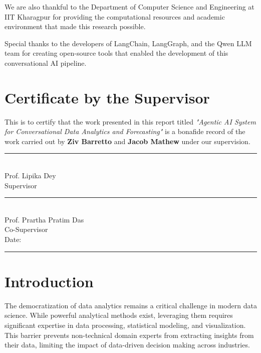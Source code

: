 \documentclass[11pt,a4paper]{article}
\begin{document}
We are also thankful to the Department of Computer Science and Engineering at IIT Kharagpur for providing the computational resources and academic environment that made this research possible.

Special thanks to the developers of LangChain, LangGraph, and the Qwen LLM team for creating open-source tools that enabled the development of this conversational AI pipeline.

\newpage
\section*{Certificate by the Supervisor}

\vspace{1cm}
This is to certify that the work presented in this report titled \textit{"Agentic AI System for Conversational Data Analytics and Forecasting"} is a bonafide record of the work carried out by \textbf{Ziv Barretto} and \textbf{Jacob Mathew} under our supervision.

\vspace{2cm}

\begin{flushright}
\rule{6cm}{0.4pt}\\
Prof. Lipika Dey\\
Supervisor\\
\vspace{0.8cm}
\rule{6cm}{0.4pt}\\
Prof. Prartha Pratim Das\\
Co-Supervisor\\
\vspace{0.8cm}
Date: \rule{3cm}{0.4pt}
\end{flushright}

\newpage
\tableofcontents

\newpage
\section{Introduction}

The democratization of data analytics remains a critical challenge in modern data science. While powerful analytical methods exist, leveraging them requires significant expertise in data processing, statistical modeling, and visualization. This barrier prevents non-technical domain experts from extracting insights from their data, limiting the impact of data-driven decision making across industries.
\end{document}
